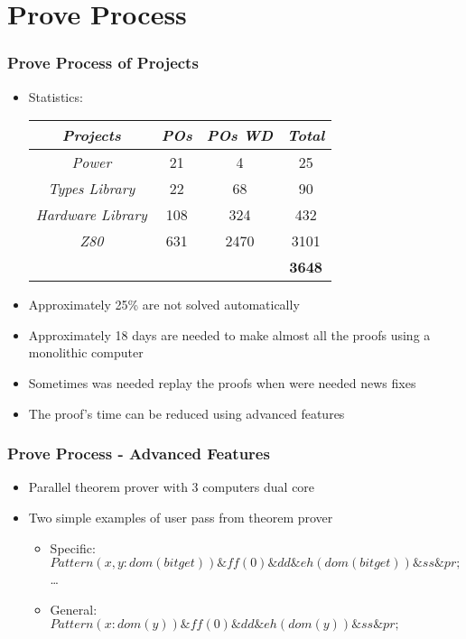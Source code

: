 \section{Prove Process}

\begin{frame}
\frametitle{Prove Process of Projects}

\begin{itemize}
   \item Statistics:\\
    \begin{center}{\footnotesize
  	 \begin{tabular}{|c|c|c|c|}
		\hline
		 \textsl{Projects} &  \textsl{POs}	& \textsl{POs WD} &	\textsl{Total}\\
		\hline
		\textit{Power} & 	21 &	4 &	25\\
		\hline
		\textit{Types Library} &	22 &	68 &	90\\
		\hline
		\textit{Hardware Library} &	108 &	324 &	432\\
		\hline
		\textit{Z80} &	631	 & 2470 & 	3101\\
		\hline
		   &    &  & 		\textbf{3648}\\
		\hline
	 \end{tabular}
   }
	\end{center}

   \item  Approximately 25\% are not solved automatically
	\item Approximately 18 days are needed to make almost all the proofs using a monolithic computer
	\item Sometimes was needed  replay the proofs when were needed news fixes
	\item The proof's time can be reduced using advanced features
	
	
\end{itemize}

\end{frame}


\begin{frame}
\frametitle{Prove Process - Advanced Features }
	\begin{itemize}
	\item Parallel theorem prover with 3 computers dual core
	\item Two simple examples of user pass from theorem prover
	
		\begin{itemize}
		   \item Specific:\\
		  	 $Pattern( x , y : dom(bitget) ) \& ff(0) \& dd \& eh(dom(bitget)) \& ss \& pr;$\\
		    \ldots
		   \item General:\\
		   	$Pattern( x : dom(y) ) \& ff(0) \& dd \& eh(dom(y)) \& ss \& pr;$
		\end{itemize}
    \end{itemize}
\end{frame}



